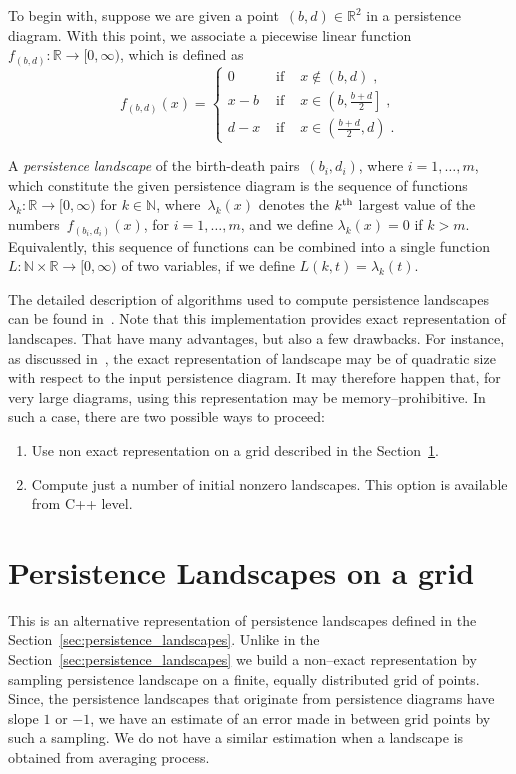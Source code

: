 \documentclass[11pt]{article}
\begin{document}
To begin with, suppose we are given a point~$(b,d) \in \mathbb{R}^2$ in a
persistence diagram. With this point, we associate a piecewise
linear function~$f_{(b,d)} : \mathbb{R} \rightarrow [0,\infty)$, which is
defined as
%
\begin{equation} \label{eq:basicLand}
  f_{(b,d)}(x) =
  \left\{ \begin{array}{ccl}
            0     & \mbox{ if } & x \not\in (b, d) \; , \\[2ex]
            x - b & \mbox{ if } & x \in \left( b, \frac{b+d}{2}
              \right] \; , \\[2ex]
            d - x & \mbox{ if } & x \in \left(\frac{b+d}{2},
              d \right) \; .
  \end{array} \right.
\end{equation}

A \emph{persistence landscape} of the birth-death
pairs~$(b_i , d_i)$, where $i = 1,\ldots,m$, which constitute the given
persistence diagram is the sequence of functions $\lambda_k : \mathbb{R}
\rightarrow [0,\infty)$ for $k \in \mathbb{N}$, where~$\lambda_k(x)$
denotes the $k^{\rm th}$ largest value of the numbers~$f_{(b_i,d_i)}(x)$,
for $i = 1, \ldots, m$, and we define $\lambda_k(x) = 0$ if $k > m$.
Equivalently, this sequence of functions can be combined into a single
function $L : \mathbb{N} \times \mathbb{R} \to [0,\infty)$ of two
variables, if we define $L(k,t) = \lambda_k(t)$.

The detailed description of algorithms used to compute persistence landscapes can be found in~\cite{landscapes2}. Note that this implementation provides exact representation of landscapes. That have many advantages, but also a few drawbacks. For instance, as discussed in~\cite{landscapes2}, the exact representation of landscape may be of quadratic size with respect to the input persistence diagram. It may therefore happen that, for very large diagrams, using this representation may be memory--prohibitive. In such a case, there are two possible ways to proceed:
\begin{enumerate}
\item Use non exact representation on a grid described in the Section~\ref{sec:landscapes_on_grid}.
\item Compute just a number of initial nonzero landscapes. This option is available from C++ level. 
\end{enumerate}



\section{Persistence Landscapes on a grid}
\label{sec:landscapes_on_grid}
This is an alternative representation of persistence landscapes defined in the Section~\ref{sec:persistence_landscapes}. Unlike in the Section~\ref{sec:persistence_landscapes} we build a non--exact representation by sampling persistence landscape on a finite, equally distributed grid of points. Since, the persistence landscapes that originate from persistence diagrams have slope $1$ or $-1$, we have an estimate of an error made in between grid points by such a sampling. We do not have a similar estimation when a landscape is obtained from averaging process. 
\end{document}
